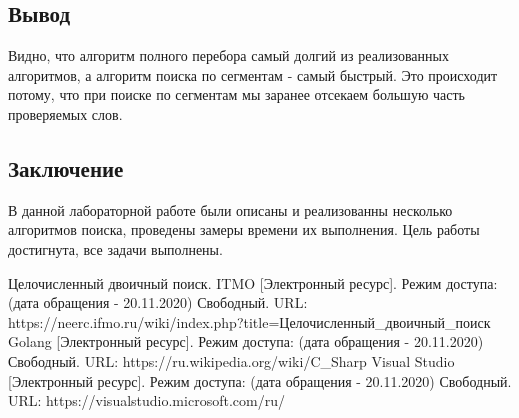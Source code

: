 \documentclass{article}
\begin{document}
	\subsection{Вывод}
	Видно, что алгоритм полного перебора самый долгий из реализованных алгоритмов, а алгоритм поиска по сегментам - самый быстрый. Это происходит потому, что при поиске по сегментам мы заранее отсекаем большую часть проверяемых слов.

	\newpage
	\begin{center}
		\section*{Заключение}
	\end{center}
	\indent \indent В данной лабораторной работе были описаны и реализованны несколько алгоритмов поиска, проведены замеры времени их  выполнения. Цель работы достигнута, все задачи выполнены.
	\newpage
	
	\begin{center}
	\begin{thebibliography}{3}
	Целочисленный двоичный поиск. ITMO [Электронный ресурс]. Режим доступа: (дата обращения - 20.11.2020) Свободный. URL: https://neerc.ifmo.ru/wiki/index.php?title=Целочисленный\_двоичный\_поиск
	Golang [Электронный ресурс]. Режим доступа: (дата обращения - 20.11.2020) Свободный. URL: https://ru.wikipedia.org/wiki/C\_Sharp
	Visual Studio [Электронный ресурс]. Режим доступа: (дата обращения - 20.11.2020) Свободный. URL: https://visualstudio.microsoft.com/ru/

	\end{thebibliography}
	\end{center}
\end{document}
